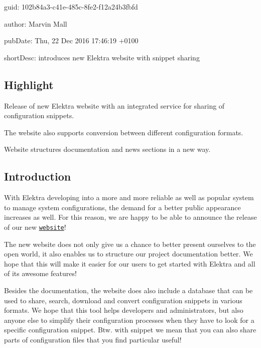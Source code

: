 
\begin{DoxyItemize}
\item guid\+: 102b84a3-\/c41e-\/485c-\/8fe2-\/f12a24b3fbfd
\item author\+: Marvin Mall
\item pub\+Date\+: Thu, 22 Dec 2016 17\+:46\+:19 +0100
\item short\+Desc\+: introduces new Elektra website with snippet sharing
\end{DoxyItemize}

\subsection*{Highlight}


\begin{DoxyEnumerate}
\item Release of new Elektra website with an integrated service for sharing of configuration snippets.
\item The website also supports conversion between different configuration formats.
\item Website structures documentation and news sections in a new way.
\end{DoxyEnumerate}

\subsection*{Introduction}

With Elektra developing into a more and more reliable as well as popular system to manage system configurations, the demand for a better public appearance increases as well. For this reason, we are happy to be able to announce the release of our new \href{https://www.libelektra.org}{\tt website}!

The new website does not only give us a chance to better present ourselves to the open world, it also enables us to structure our project documentation better. We hope that this will make it easier for our users to get started with Elektra and all of its awesome features!

Besides the documentation, the website does also include a database that can be used to share, search, download and convert configuration snippets in various formats. We hope that this tool helps developers and administrators, but also anyone else to simplify their configuration processes when they have to look for a specific configuration snippet. Btw. with snippet we mean that you can also share parts of configuration files that you find particular useful!


